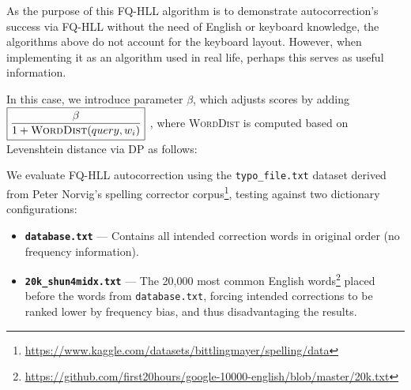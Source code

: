 \documentclass[12pt,a4paper]{article}
\begin{document}
\vspace{1.0em}
As the purpose of this FQ-HLL algorithm is to demonstrate autocorrection's success via FQ-HLL without the need of English or keyboard knowledge, the algorithms above do not account for the keyboard layout. However, when implementing it as an algorithm used in real life, perhaps this serves as useful information. \newline

In this case, we introduce parameter $\beta$, which adjusts scores by adding $\boxed{\frac{\beta}{1 + \textsc{WordDist}(query, w_i)}}$ , where \textsc{WordDist} is computed based on Levenshtein distance via DP as follows: \newline


\newpage
\vspace{1.0em}

We evaluate FQ-HLL autocorrection using the \texttt{typo\_file.txt} dataset derived from Peter Norvig's spelling corrector corpus\footnote{\url{https://www.kaggle.com/datasets/bittlingmayer/spelling/data}}, testing against two dictionary configurations:

\begin{itemize}
  \item \textbf{\texttt{database.txt}} --- Contains all intended correction words in original order (no frequency information).
  \item \textbf{\texttt{20k\_shun4midx.txt}} --- The 20{,}000 most common English words\footnote{\url{https://github.com/first20hours/google-10000-english/blob/master/20k.txt}} placed before the words from \texttt{database.txt}, forcing intended corrections to be ranked lower by frequency bias, and thus disadvantaging the results.
\end{itemize}
\end{document}
